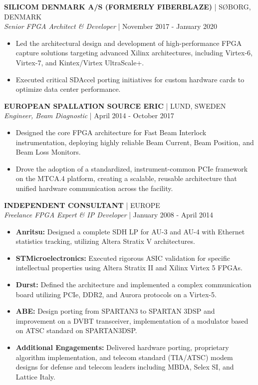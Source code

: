 \documentclass[10pt, letterpaper]{article}
\begin{document}
\vspace{6pt}
\noindent \textbf{SILICOM DENMARK A/S (FORMERLY FIBERBLAZE)} | SØBORG, DENMARK\\
\textit{Senior FPGA Architect \& Developer} | November 2017 - January 2020
\begin{itemize}[leftmargin=*, nosep]
    \item Led the architectural design and development of high-performance FPGA capture solutions targeting advanced Xilinx architectures, including Virtex-6, Virtex-7, and Kintex/Virtex UltraScale+.
    \item Executed critical SDAccel porting initiatives for custom hardware cards to optimize data center performance.
\end{itemize}

\vspace{6pt}
\noindent \textbf{EUROPEAN SPALLATION SOURCE ERIC} | LUND, SWEDEN\\
\textit{Engineer, Beam Diagnostic} | April 2014 - October 2017
\begin{itemize}[leftmargin=*, nosep]
    \item Designed the core FPGA architecture for Fast Beam Interlock instrumentation, deploying highly reliable Beam Current, Beam Position, and Beam Loss Monitors.
    \item Drove the adoption of a standardized, instrument-common PCIe framework on the MTCA.4 platform, creating a scalable, reusable architecture that unified hardware communication across the facility.
\end{itemize}

\vspace{6pt}
\noindent \textbf{INDEPENDENT CONSULTANT} | EUROPE\\
\textit{Freelance FPGA Expert \& IP Developer} | January 2008 - April 2014
\begin{itemize}[leftmargin=*, nosep]
    \item \textbf{Anritsu:} Designed a complete SDH LP for AU-3 and AU-4 with Ethernet statistics tracking, utilizing Altera Stratix V architectures.
    \item \textbf{STMicroelectronics:} Executed rigorous ASIC validation for specific intellectual properties using Altera Stratix II and Xilinx Virtex 5 FPGAs.
    \item \textbf{Durst:} Defined the architecture and implemented a complex communication board utilizing PCIe, DDR2, and Aurora protocols on a Virtex-5.
    \item \textbf{ABE:} Design porting from SPARTAN3 to SPARTAN 3DSP and improvement on a DVBT transceiver, implementation of a modulator based on ATSC standard on SPARTAN3DSP.
    \item \textbf{Additional Engagements:} Delivered hardware porting, proprietary algorithm implementation, and telecom standard (TIA/ATSC) modem designs for defense and telecom leaders including MBDA, Selex SI, and Lattice Italy.
\end{itemize}
\end{document}
